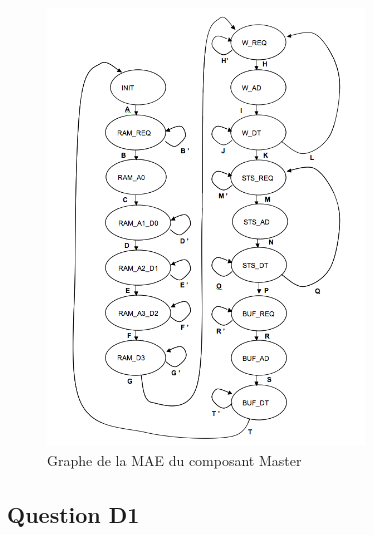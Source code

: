 \documentclass{article}
\begin{document}
\begin{figure}[H]
\includegraphics[width=0.75\textwidth]{pics/mae_master.png}
\centering
\caption{Graphe de la MAE du composant Master}
\label{mae_ram}
\end{figure}

\subsection{Question D1}
\end{document}
